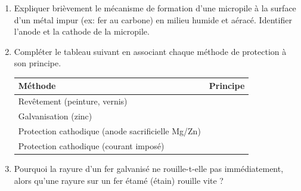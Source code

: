\documentclass[11pt]{article}
\begin{document}
\begin{exercice}
\begin{enumerate}
    \item Expliquer brièvement le mécanisme de formation d'une micropile à la surface d'un métal impur (ex: fer au carbone) en milieu humide et aéracé. Identifier l'anode et la cathode de la micropile.
    \item Compléter le tableau suivant en associant chaque méthode de protection à son principe.
    \begin{center}
    \begin{tabular}{|l|p{6cm}|}
    \hline
    \textbf{Méthode} & \textbf{Principe} \\
    \hline
    Revêtement (peinture, vernis) & \dotfill \\
    \hline
    Galvanisation (zinc) & \dotfill \\
    \hline
    Protection cathodique (anode sacrificielle Mg/Zn) & \dotfill \\
    \hline
    Protection cathodique (courant imposé) & \dotfill \\
    \hline
    \end{tabular}
    \end{center}
    \item Pourquoi la rayure d'un fer galvanisé ne rouille-t-elle pas immédiatement, alors qu'une rayure sur un fer étamé (étain) rouille vite ?
\end{enumerate}
\end{exercice}
\end{document}
